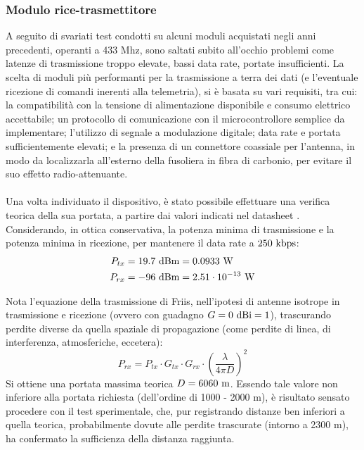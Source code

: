 \documentclass[12pt]{article}
\begin{document}
\subsubsection*{Modulo rice-trasmettitore}
A seguito di svariati test condotti su alcuni moduli acquistati negli anni precedenti, operanti a 433 Mhz, sono saltati subito all'occhio problemi come latenze di trasmissione troppo elevate, bassi data rate, portate insufficienti.
La scelta di moduli più performanti per la trasmissione a terra dei dati (e l'eventuale ricezione di comandi inerenti alla telemetria), si è basata su vari requisiti, tra cui: la compatibilità con la tensione di alimentazione disponibile e consumo elettrico accettabile; un protocollo di comunicazione con il microcontrollore semplice da implementare; l'utilizzo di segnale a modulazione digitale; data rate e portata  sufficientemente elevati; e la presenza di un connettore coassiale per l'antenna, in modo da localizzarla all'esterno della fusoliera in fibra di carbonio, per evitare il suo effetto radio-attenuante.
\\\\
Una volta individuato il dispositivo, è stato possibile effettuare una verifica teorica della sua portata, a partire dai valori indicati nel datasheet \cite{rf-datasheet}. Considerando, in ottica conservativa, la potenza minima di trasmissione e la potenza minima in ricezione, per mantenere il data rate a $250 \textnormal{ kbps}$:
\begin{equation*}
\begin{split}
P_{tx} &= 19.7 \textnormal{ dBm} = 0.0933 \textnormal{ W} \\
P_{rx} &= -96 \textnormal{ dBm} = 2.51 \cdot 10^{-13} \textnormal{ W}
\end{split}
\end{equation*}

\noindent
Nota l'equazione della trasmissione di Friis, nell'ipotesi di antenne isotrope in trasmissione e ricezione (ovvero con guadagno $G = 0 \textnormal{ dBi} = 1$), trascurando perdite diverse da quella spaziale di propagazione (come perdite di linea, di interferenza, atmosferiche, eccetera):
\begin{equation}
P_{rx} = P_{tx} \cdot G_{tx} \cdot G_{rx} \cdot \left(\frac{\lambda}{4 \pi D}\right)^2
\end{equation}
Si ottiene una portata massima teorica $D = 6060 \textnormal{ m}$. Essendo tale valore non inferiore alla portata richiesta (dell'ordine di 1000 - 2000 m), è risultato sensato procedere con il test sperimentale, che, pur registrando distanze ben inferiori a quella teorica, probabilmente dovute alle perdite trascurate (intorno a 2300 m), ha confermato la sufficienza della distanza raggiunta.
\end{document}
